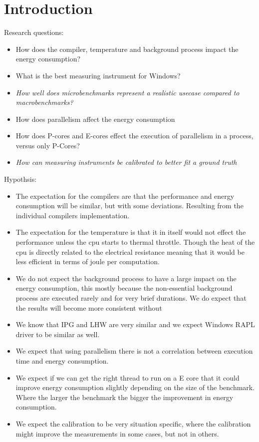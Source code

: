 \section{Introduction}

Research questions:

\begin{itemize}
    \item How does the compiler, temperature and background process impact the energy consumption?
    \item What is the best measuring instrument for Windows?
    \item \textit{How well does microbenchmarks represent a realistic usecase compared to macrobenchmarks?}
    \item How does parallelism affect the energy consumption
    \item How does P-cores and E-cores effect the execution of parallelism in a process, versus only P-Cores?
    \item \textit{How can measuring instruments be calibrated to better fit a ground truth}
\end{itemize}


Hypothsis:

\begin{itemize}
    \item The expectation for the compilers are that the performance and energy consumption will be similar, but with some deviations. Resulting from the individual compilers implementation.
    \item The expectation for the temperature is that it in itself would not effect the performance unless the cpu starts to thermal throttle. Though the heat of the cpu is directly related to the electrical resistance meaning that it would be less efficient in terms of joule per computation.
    \item We do not expect the background process to have a large impact on the energy consumption, this mostly because the non-essential background process are executed rarely and for very brief durations. We do expect that the results will become more consistent without 
    \item We know that IPG and LHW are very similar and we expect Windows RAPL driver to be similar as well.
    \item We expect that using parallelism there is not a correlation between execution time and energy consumption.
    \item We expect if we can get the right thread to run on a E core that it could improve energy consumption slightly depending on the size of the benchmark. Where the larger the benchmark the bigger the improvement in energy consumption.
    \item We expect the calibration to be very situation specific, where the calibration might improve the measurements in some cases, but not in others.
\end{itemize}